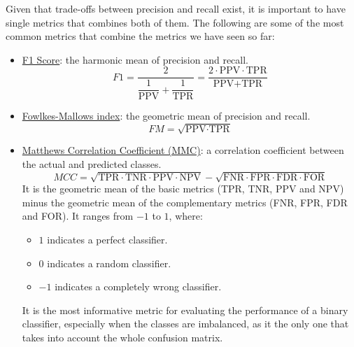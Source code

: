 Given that trade-offs between precision and recall exist, it is important to have single metrics that combines both of them. The following are some of the most common metrics that combine the metrics we have seen so far:
\begin{itemize}
    \item \ul{F1 Score}: the harmonic mean of precision and recall.
    \begin{equation} \label{label:f1-score}
        F1 = \dfrac{2}{\dfrac{1}{\text{PPV}} + \dfrac{1}{\text{TPR}}} = \dfrac{2 \cdot \text{PPV} \cdot \text{TPR}}{\text{PPV} + \text{TPR}}
    \end{equation}
    \item \ul{Fowlkes-Mallows index}: the geometric mean of precision and recall.
    \begin{equation} \label{label:fowlkes-mallows}
        FM = \sqrt{\text{PPV} \cdot \text{TPR}}
    \end{equation}
    \item \ul{Matthews Correlation Coefficient (MMC)}: a correlation coefficient between the actual and predicted classes.
    \begin{equation} \label{label:mmc}
        MCC = \sqrt{\text{TPR} \cdot \text{TNR} \cdot \text{PPV} \cdot \text{NPV}} - \sqrt{\text{FNR} \cdot \text{FPR} \cdot \text{FDR} \cdot \text{FOR}}
    \end{equation}
    It is the geometric mean of the basic metrics (TPR, TNR, PPV and NPV) minus the geometric mean of the complementary metrics (FNR, FPR, FDR and FOR). It ranges from $-1$ to $1$, where:
    \begin{itemize}
        \item $1$ indicates a perfect classifier.
        \item $0$ indicates a random classifier.
        \item $-1$ indicates a completely wrong classifier.
    \end{itemize}

    It is the most informative metric for evaluating the performance of a binary classifier, especially when the classes are imbalanced, as it the only one that takes into account the whole confusion matrix.
\end{itemize}


